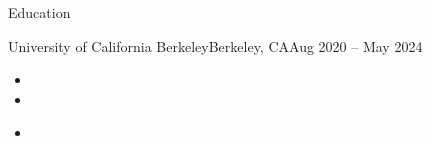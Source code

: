 \documentclass[]{mcdowellcv}
\begin{document}
	\makeheader

        \begin{cvsection}{Education}

		\begin{cvsubsection}{University of California Berkeley}{Berkeley, CA}{Aug 2020 -- May 2024}
			\begin{itemize}
				\item {}
                    \item {}
			\end{itemize}
                \begin{itemize}
				\item {}
			\end{itemize}
		\end{cvsubsection}
  
	\end{cvsection}
\end{document}
